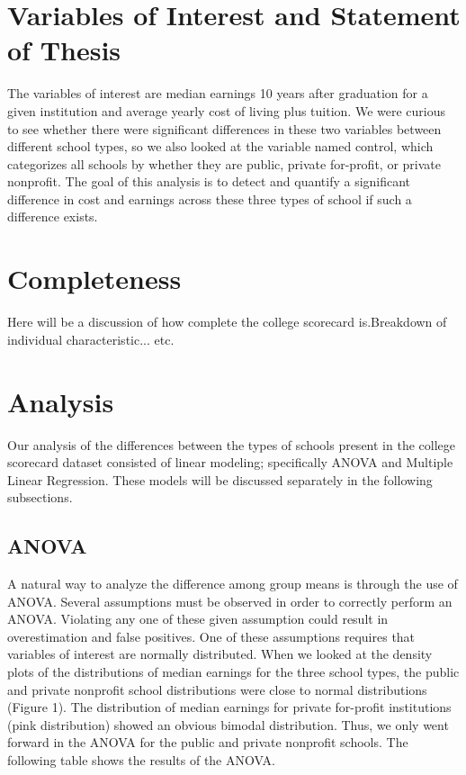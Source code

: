 \documentclass[%
 reprint,
 amsmath,amssymb,
 aps,
]{revtex4-1}
\begin{document}
\section{\label{sec:level1}Variables of Interest and Statement of Thesis}
The variables of interest are median earnings 10 years after graduation for a given institution and average yearly cost of living plus tuition.  We were curious to see whether there were significant differences in these two variables between different school types, so we also looked at the variable named control, which categorizes all schools by whether they are public, private for-profit, or private nonprofit. The goal of this analysis is to detect and quantify a significant difference in cost and earnings across these three types of school if such a difference exists.  

\section{\label{sec:level1}Completeness}
Here will be a discussion of how complete the college scorecard is.Breakdown of individual characteristic... etc. 

\section{\label{sec:level1}Analysis}
Our analysis of the differences between the types of schools present in the college scorecard dataset consisted of linear modeling; specifically ANOVA and Multiple Linear Regression.  These models will be discussed separately in the following subsections. 

\subsection{\label{sec:level2}ANOVA}
A natural way to analyze the difference among group means is through the use of ANOVA.  Several assumptions must be observed in order to correctly perform an ANOVA.  Violating any one of these given assumption could result in overestimation and false positives.  One of these assumptions requires that variables of interest are normally distributed.  When we looked at the density plots of the distributions of median earnings for the three school types, the public and private nonprofit school distributions were close to normal distributions (Figure 1).  The distribution of median earnings for private for-profit institutions (pink distribution) showed an obvious bimodal distribution.  Thus, we only went forward in the ANOVA for the public and private nonprofit schools.  The following table shows the results of the ANOVA.
\end{document}
